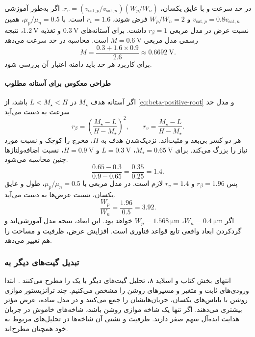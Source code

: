 در حد سرعت و با عایق یکسان،
\(r_v=(v_{\mathrm{sat},p}/v_{\mathrm{sat},n})(W_p/W_n)\).
اگر به‌طور آموزشی \(v_{\mathrm{sat},p}=0.8v_{\mathrm{sat},n}\)
و \(W_p/W_n=2\) فرض شوند، \(r_v=1.6\) است.
با \(\mu_p/\mu_n=0.5\)، همین نسبت عرض در مدل مربعی
\(r_\beta=1\) داشت. برای آستانه‌های \(\qty{0.3}{\volt}\) و
تغذیه \(\qty{1.2}{\volt}\)، نتیجه رسمی مدل مربعی
\(M=\qty{0.6}{\volt}\) است. محاسبه در حد سرعت می‌دهد
\[
 M=\frac{0.3+1.6\times0.9}{2.6}\approx\qty{0.6692}{\volt}.
\]
برای کاربرد هر حد باید دامنه اعتبار آن بررسی شود.

\paragraph*{طراحی معکوس برای آستانه مطلوب}
اگر آستانه هدف \(M_\star\) در \(L<M_\star<H\) باشد، از
\eqref{eq:beta-positive-root} و مدل حد سرعت به دست می‌آید
\begin{equation}
 \boxed{r_\beta=\left(\frac{M_\star-L}{H-M_\star}\right)^2},\qquad
 \boxed{r_v=\frac{M_\star-L}{H-M_\star}}.
 \label{eq:beta-inverse-sizing}
\end{equation}
هر دو کسر بی‌بعد و مثبت‌اند. نزدیک‌شدن هدف به \(H\)، مخرج را
کوچک و نسبت مورد نیاز را بزرگ می‌کند.
برای \(M_\star=\qty{0.65}{\volt}\)، \(L=\qty{0.3}{\volt}\)
و \(H=\qty{0.9}{\volt}\)، نسبت اضافه‌ولتاژها چنین محاسبه می‌شود.
\[
 \frac{0.65-0.3}{0.9-0.65}=\frac{0.35}{0.25}=1.4.
\]
پس \(r_\beta=1.96\) و \(r_v=1.4\) لازم است.
در مدل مربعی با \(\mu_p/\mu_n=0.5\)، طول و عایق یکسان،
نسبت عرض‌ها به دست می‌آید.
\[
 \frac{W_p}{W_n}=\frac{1.96}{0.5}=3.92.
\]
اگر \(W_n=\qty{0.4}{\micro\metre}\)،
\(W_p=\qty{1.568}{\micro\metre}\) خواهد بود.
این ابعاد، نتیجه مدل آموزشی‌اند و گردکردن ابعاد واقعی تابع قواعد
فناوری است. افزایش عرض، ظرفیت و مساحت را هم تغییر می‌دهد.

\subsubsection{تبدیل گیت‌های دیگر به }
\label{sec:beta-equivalent-inverter}
انتهای بخش  کتاب و اسلاید ۸، تحلیل گیت‌های دیگر
با یک  را مطرح می‌کنند
\cite[صفحه ۹۰ و آغاز ۹۱]{weste}\cite[اسلاید ۸]{dcslides}.
ابتدا ورودی‌های ثابت و متغیر و مسیرهای روشن را مشخص می‌کنیم.
چند ترانزیستور موازی روشن با بایاس‌های یکسان، جریان‌هایشان را جمع
می‌کنند و در مدل ساده، عرض مؤثر بیشتری می‌دهند. اگر تنها یک
شاخه موازی روشن باشد، شاخه‌های خاموش در جریان هدایت ایده‌آل
سهم صفر دارند. ظرفیت و نشتی آن شاخه‌ها در تحلیل‌های مربوط به
خود همچنان مطرح‌اند.

